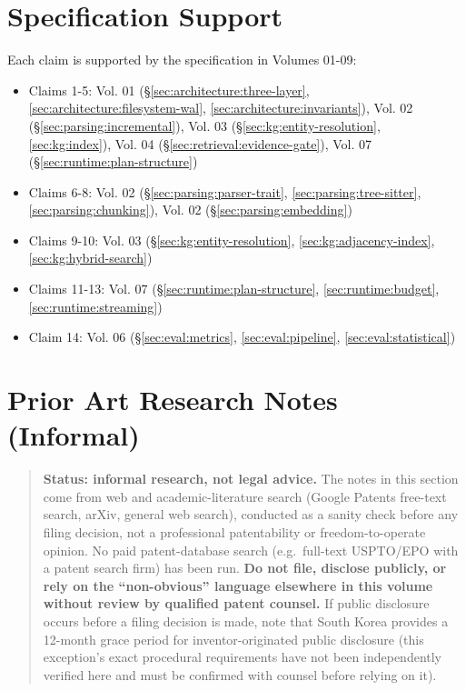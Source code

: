 \section{Specification Support}
\label{sec:patent:spec-support}

Each claim is supported by the specification in Volumes 01-09:
\begin{itemize}
  \item Claims 1-5: Vol. 01 (\S\ref{sec:architecture:three-layer}, \ref{sec:architecture:filesystem-wal}, \ref{sec:architecture:invariants}), Vol. 02 (\S\ref{sec:parsing:incremental}), Vol. 03 (\S\ref{sec:kg:entity-resolution}, \ref{sec:kg:index}), Vol. 04 (\S\ref{sec:retrieval:evidence-gate}), Vol. 07 (\S\ref{sec:runtime:plan-structure})
  \item Claims 6-8: Vol. 02 (\S\ref{sec:parsing:parser-trait}, \ref{sec:parsing:tree-sitter}, \ref{sec:parsing:chunking}), Vol. 02 (\S\ref{sec:parsing:embedding})
  \item Claims 9-10: Vol. 03 (\S\ref{sec:kg:entity-resolution}, \ref{sec:kg:adjacency-index}, \ref{sec:kg:hybrid-search})
  \item Claims 11-13: Vol. 07 (\S\ref{sec:runtime:plan-structure}, \ref{sec:runtime:budget}, \ref{sec:runtime:streaming})
  \item Claim 14: Vol. 06 (\S\ref{sec:eval:metrics}, \ref{sec:eval:pipeline}, \ref{sec:eval:statistical})
\end{itemize}

\section{Prior Art Research Notes (Informal)}
\label{sec:patent:prior-art-notes}

\begin{quote}
\textbf{Status: informal research, not legal advice.} The notes in this section come from web and academic-literature search (Google Patents free-text search, arXiv, general web search), conducted as a sanity check before any filing decision, not a professional patentability or freedom-to-operate opinion. No paid patent-database search (e.g.\ full-text USPTO/EPO with a patent search firm) has been run. \textbf{Do not file, disclose publicly, or rely on the ``non-obvious'' language elsewhere in this volume without review by qualified patent counsel.} If public disclosure occurs before a filing decision is made, note that South Korea provides a 12-month grace period for inventor-originated public disclosure (this exception's exact procedural requirements have not been independently verified here and must be confirmed with counsel before relying on it).
\end{quote}

